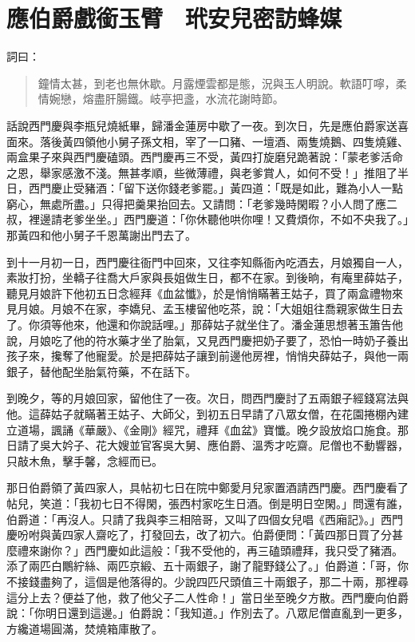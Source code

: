 
\chapter{應伯爵戲銜玉臂　玳安兒密訪蜂媒}

詞曰：
\begin{quote}
鐘情太甚，到老也無休歇。月露煙雲都是態，況與玉人明說。軟語叮嚀，柔情婉戀，熔盡肝腸鐵。岐亭把盞，水流花謝時節。
\end{quote}

話說西門慶與李瓶兒燒紙畢，歸潘金蓮房中歇了一夜。到次日，先是應伯爵家送喜面來。落後黃四領他小舅子孫文相，宰了一口豬、一壇酒、兩隻燒鵝、四隻燒雞、兩盒果子來與西門慶磕頭。西門慶再三不受，黃四打旋磨兒跪著說：「蒙老爹活命之恩，舉家感激不淺。無甚孝順，些微薄禮，與老爹賞人，如何不受！」推阻了半日，西門慶止受豬酒：「留下送你錢老爹罷。」黃四道：「既是如此，難為小人一點窮心，無處所盡。」只得把羹果抬回去。又請問：「老爹幾時閑暇？小人問了應二叔，裡邊請老爹坐坐。」西門慶道：「你休聽他哄你哩！又費煩你，不如不央我了。」那黃四和他小舅子千恩萬謝出門去了。

到十一月初一日，西門慶往衙門中回來，又往李知縣衙內吃酒去，月娘獨自一人，素妝打扮，坐轎子往喬大戶家與長姐做生日，都不在家。到後晌，有庵里薛姑子，聽見月娘許下他初五日念經拜《血盆懺》，於是悄悄瞞著王姑子，買了兩盒禮物來見月娘。月娘不在家，李嬌兒、孟玉樓留他吃茶，說：「大姐姐往喬親家做生日去了。你須等他來，他還和你說話哩。」那薛姑子就坐住了。潘金蓮思想著玉簫告他說，月娘吃了他的符水藥才坐了胎氣，又見西門慶把奶子要了，恐怕一時奶子養出孩子來，攙奪了他寵愛。於是把薛姑子讓到前邊他房裡，悄悄央薛姑子，與他一兩銀子，替他配坐胎氣符藥，不在話下。

到晚夕，等的月娘回家，留他住了一夜。次日，問西門慶討了五兩銀子經錢寫法與他。這薛姑子就瞞著王姑子、大師父，到初五日早請了八眾女僧，在花園捲棚內建立道場，諷誦《華嚴》、《金剛》經咒，禮拜《血盆》寶懺。晚夕設放焰口施食。那日請了吳大妗子、花大嫂並官客吳大舅、應伯爵、溫秀才吃齋。尼僧也不動響器，只敲木魚，擊手馨，念經而已。

那日伯爵領了黃四家人，具帖初七日在院中鄭愛月兒家置酒請西門慶。西門慶看了帖兒，笑道：「我初七日不得閑，張西村家吃生日酒。倒是明日空閑。」問還有誰，伯爵道：「再沒人。只請了我與李三相陪哥，又叫了四個女兒唱《西廂記》。」西門慶吩咐與黃四家人齋吃了，打發回去，改了初六。伯爵便問：「黃四那日買了分甚麼禮來謝你？」西門慶如此這般：「我不受他的，再三磕頭禮拜，我只受了豬酒。添了兩匹白鷳紵絲、兩匹京緞、五十兩銀子，謝了龍野錢公了。」伯爵道：「哥，你不接錢盡夠了，這個是他落得的。少說四匹尺頭值三十兩銀子，那二十兩，那裡尋這分上去？便益了他，救了他父子二人性命！」當日坐至晚夕方散。西門慶向伯爵說：「你明日還到這邊。」伯爵說：「我知道。」作別去了。八眾尼僧直亂到一更多，方纔道場圓滿，焚燒箱庫散了。

